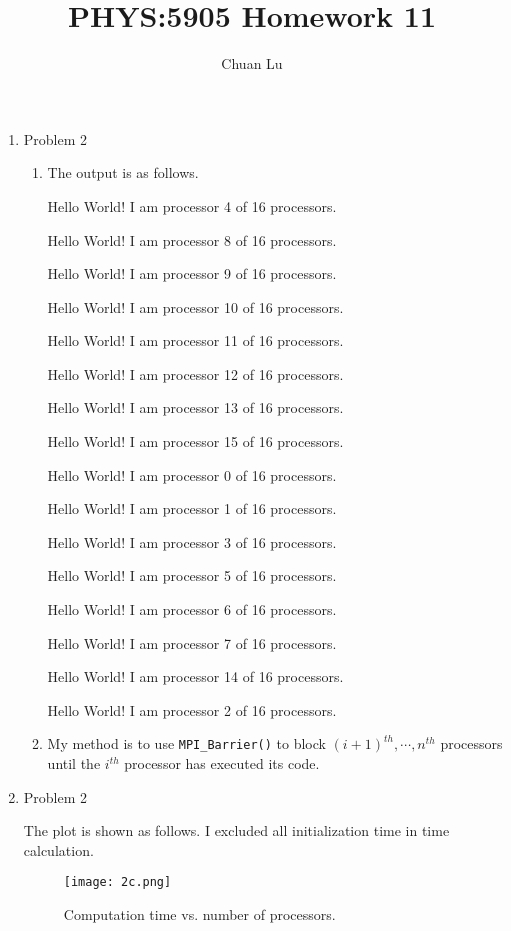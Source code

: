 \documentclass{article}
\begin{document}
\author{Chuan Lu}
\title{PHYS:5905 Homework 11}
\maketitle

\medskip

\begin{enumerate}

\item Problem 2

\begin{enumerate}

\item The output is as follows.

Hello World! I am processor 4 of 16 processors.

Hello World! I am processor 8 of 16 processors.

Hello World! I am processor 9 of 16 processors.

Hello World! I am processor 10 of 16 processors.

Hello World! I am processor 11 of 16 processors.

Hello World! I am processor 12 of 16 processors.

Hello World! I am processor 13 of 16 processors.

Hello World! I am processor 15 of 16 processors.

Hello World! I am processor 0 of 16 processors.

Hello World! I am processor 1 of 16 processors.

Hello World! I am processor 3 of 16 processors.

Hello World! I am processor 5 of 16 processors.

Hello World! I am processor 6 of 16 processors.

Hello World! I am processor 7 of 16 processors.

Hello World! I am processor 14 of 16 processors.

Hello World! I am processor 2 of 16 processors.

\item My method is to use \texttt{MPI\_Barrier()} to block $(i+1)^{th}, \cdots, n^{th} $ processors until the $i^{th} $ processor has executed its code.

\end{enumerate}

\item Problem 2

The plot is shown as follows. I excluded all initialization time in time calculation.

\begin{figure}
\centering
\texttt{[image: 2c.png]}
\caption{Computation time vs. number of processors.}
\label{1}
\end{figure}


\end{enumerate}
\end{document}
